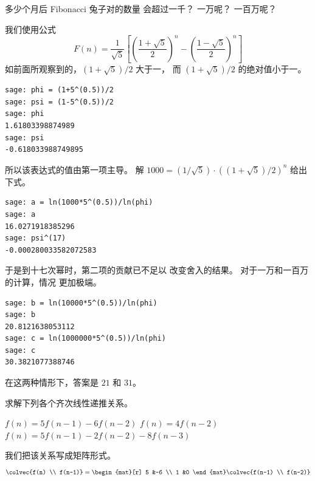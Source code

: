 \begin{exercises}
  \item 
   多少个月后 Fibonacci 兔子对的数量
   会超过一千？
   一万呢？
   一百万呢？
   \begin{answer}
     我们使用公式
     \begin{equation*}
       F(n)=\frac{1}{\sqrt{5}}\left[\left(\frac{1+\sqrt{5}}{2}\right)^{n}
                               -\left(\frac{1-\sqrt{5}}{2}\right)^{n}\right]
     \end{equation*}
     如前面所观察到的，$(1+\sqrt{5})/2$ 大于一，
     而 $(1+\sqrt{5})/2$ 的绝对值小于一。
\begin{lstlisting}
sage: phi = (1+5^(0.5))/2
sage: psi = (1-5^(0.5))/2
sage: phi
1.61803398874989
sage: psi
-0.618033988749895       
\end{lstlisting}
     所以该表达式的值由第一项主导。
     解 $1000=(1/\sqrt{5})\cdot ((1+\sqrt{5})/2)^n$ 给出
     下式。
\begin{lstlisting}
sage: a = ln(1000*5^(0.5))/ln(phi)
sage: a
16.0271918385296
sage: psi^(17)
-0.000280033582072583       
\end{lstlisting}
   于是到十七次幂时，第二项的贡献已不足以
   改变舍入的结果。
   对于一万和一百万的计算，情况
   更加极端。
\begin{lstlisting}
sage: b = ln(10000*5^(0.5))/ln(phi)
sage: b
20.8121638053112
sage: c = ln(1000000*5^(0.5))/ln(phi)
sage: c
30.3821077388746    
\end{lstlisting}
   在这两种情形下，答案是 $21$ 和 $31$。
   \end{answer}
  \item 
   求解下列各个齐次线性递推关系。
   \begin{exparts}
     \partsitem $f(n)=5f(n-1)-6f(n-2)$   
     \partsitem $f(n)=4f(n-2)$   
     \partsitem $f(n)=5f(n-1)-2f(n-2)-8f(n-3)$   
   \end{exparts}
   \begin{answer}
    \begin{exparts}
      \partsitem 
        我们把该关系写成矩阵形式。
        \begin{equation*}
          \colvec{f(n) \\ f(n-1)}
          =
          \begin{mat}[r]
            5  &-6  \\
            1  &0
          \end{mat}
          \colvec{f(n-1) \\ f(n-2)}
        \end{equation*}

\end{exparts}
\end{answer}
\end{exercises}
